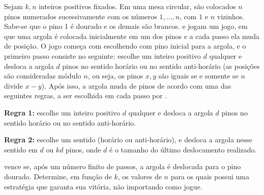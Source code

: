 Sejam $k, n$ inteiros positivos fixados. Em uma mesa circular, são colocados $n$ pinos numerados sucessivamente com os números $1, \dots, n$, com $1$ e $n$ vizinhos. Sabe-se que o pino 1 é dourado e os demais são brancos.  e  jogam um jogo, em que uma argola é colocada inicialmente em um dos pinos e a cada passo ela muda de posição. O jogo começa com  escolhendo com pino inicial para a argola, e o primeiro passo consiste no seguinte:  escolhe um inteiro positivo $d$ qualquer e  desloca a argola $d$ pinos no sentido horário ou no sentido anti-horário (as posições são consideradas módulo $n$, ou seja, os pinos $x, y$ são iguais se e somente se $n$ divide $x-y$). Após isso, a argola muda de pinos de acordo com uma das seguintes regras, a ser escolhida em cada passo por .

\textbf{Regra 1:}  escolhe um inteiro positivo $d$ qualquer e  desloca a argola $d$ pinos no sentido horário ou no sentido anti-horário.

\textbf{Regra 2:}  escolhe um sentido (horário ou anti-horário), e  desloca a argola nesse sentido em $d$ ou $kd$ pinos, onde $d$ é o tamanho do último deslocamento realizado.

 vence se, após um número finito de passos, a argola é deslocada para o pino dourado. Determine, em função de $k$, os valores de $n$ para os quais  possui uma estratégia que garanta sua vitória, não importando como  jogue.
